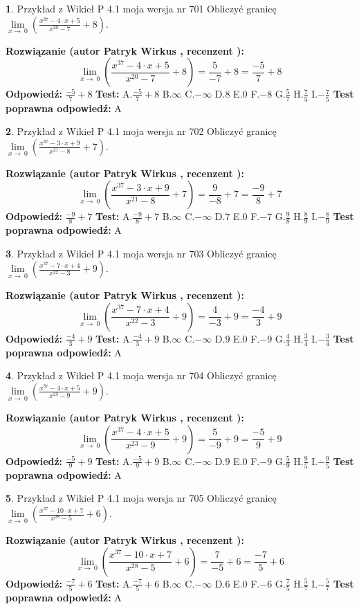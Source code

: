 \documentclass[12pt, a4paper]{article}
\theoremstyle{definition} %
\newtheorem{zad}{}
\newcommand{\zadStart}[1]{\begin{zad}#1\newline}
\newcommand{\zadStop}{\end{zad}}
\newcommand{\rozwStart}[2]{\noindent \textbf{Rozwiązanie (autor #1 , recenzent #2): }\newline}
\newcommand{\rozwStop}{\newline}
\newcommand{\odpStart}{\noindent \textbf{Odpowiedź:}\newline}
\newcommand{\odpStop}{\newline}
\newcommand{\testStart}{\noindent \textbf{Test:}\newline}
\newcommand{\testStop}{\newline}
\newcommand{\kluczStart}{\noindent \textbf{Test poprawna odpowiedź:}\newline}
\newcommand{\kluczStop}{\newline}
\begin{document}
\zadStart{Przykład z Wikieł P 4.1 moja wersja nr 701}
Obliczyć granicę $\lim\limits_{x\to\ 0}(\frac{x^{37}-4 \cdot x +5}{x^{20}-7}+8)$.
\zadStop
\rozwStart{Patryk Wirkus}{}
$$\lim\limits_{x\to\ 0}(\frac{x^{37}-4 \cdot x +5}{x^{20}-7}+8)=\frac{5}{-7}+8=\frac{-5}{7}+8$$
\rozwStop
\odpStart
$\frac{-5}{7}+8$
\odpStop
\testStart
A.$\frac{-5}{7}+8$
B.$\infty$
C.$-\infty$
D.$8$
E.$0$
F.$-8$
G.$\frac{5}{7}$
H.$\frac{7}{5}$
I.$-\frac{7}{5}$
\testStop
\kluczStart
A
\kluczStop



\zadStart{Przykład z Wikieł P 4.1 moja wersja nr 702}
Obliczyć granicę $\lim\limits_{x\to\ 0}(\frac{x^{37}-3 \cdot x +9}{x^{21}-8}+7)$.
\zadStop
\rozwStart{Patryk Wirkus}{}
$$\lim\limits_{x\to\ 0}(\frac{x^{37}-3 \cdot x +9}{x^{21}-8}+7)=\frac{9}{-8}+7=\frac{-9}{8}+7$$
\rozwStop
\odpStart
$\frac{-9}{8}+7$
\odpStop
\testStart
A.$\frac{-9}{8}+7$
B.$\infty$
C.$-\infty$
D.$7$
E.$0$
F.$-7$
G.$\frac{9}{8}$
H.$\frac{8}{9}$
I.$-\frac{8}{9}$
\testStop
\kluczStart
A
\kluczStop



\zadStart{Przykład z Wikieł P 4.1 moja wersja nr 703}
Obliczyć granicę $\lim\limits_{x\to\ 0}(\frac{x^{37}-7 \cdot x +4}{x^{22}-3}+9)$.
\zadStop
\rozwStart{Patryk Wirkus}{}
$$\lim\limits_{x\to\ 0}(\frac{x^{37}-7 \cdot x +4}{x^{22}-3}+9)=\frac{4}{-3}+9=\frac{-4}{3}+9$$
\rozwStop
\odpStart
$\frac{-4}{3}+9$
\odpStop
\testStart
A.$\frac{-4}{3}+9$
B.$\infty$
C.$-\infty$
D.$9$
E.$0$
F.$-9$
G.$\frac{4}{3}$
H.$\frac{3}{4}$
I.$-\frac{3}{4}$
\testStop
\kluczStart
A
\kluczStop



\zadStart{Przykład z Wikieł P 4.1 moja wersja nr 704}
Obliczyć granicę $\lim\limits_{x\to\ 0}(\frac{x^{37}-4 \cdot x +5}{x^{23}-9}+9)$.
\zadStop
\rozwStart{Patryk Wirkus}{}
$$\lim\limits_{x\to\ 0}(\frac{x^{37}-4 \cdot x +5}{x^{23}-9}+9)=\frac{5}{-9}+9=\frac{-5}{9}+9$$
\rozwStop
\odpStart
$\frac{-5}{9}+9$
\odpStop
\testStart
A.$\frac{-5}{9}+9$
B.$\infty$
C.$-\infty$
D.$9$
E.$0$
F.$-9$
G.$\frac{5}{9}$
H.$\frac{9}{5}$
I.$-\frac{9}{5}$
\testStop
\kluczStart
A
\kluczStop



\zadStart{Przykład z Wikieł P 4.1 moja wersja nr 705}
Obliczyć granicę $\lim\limits_{x\to\ 0}(\frac{x^{37}-10 \cdot x +7}{x^{28}-5}+6)$.
\zadStop
\rozwStart{Patryk Wirkus}{}
$$\lim\limits_{x\to\ 0}(\frac{x^{37}-10 \cdot x +7}{x^{28}-5}+6)=\frac{7}{-5}+6=\frac{-7}{5}+6$$
\rozwStop
\odpStart
$\frac{-7}{5}+6$
\odpStop
\testStart
A.$\frac{-7}{5}+6$
B.$\infty$
C.$-\infty$
D.$6$
E.$0$
F.$-6$
G.$\frac{7}{5}$
H.$\frac{5}{7}$
I.$-\frac{5}{7}$
\testStop
\kluczStart
A
\kluczStop
\end{document}
